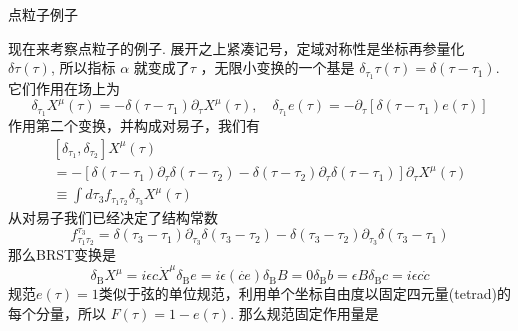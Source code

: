 \centerline{\Large 点粒子例子}
现在来考察点粒子的例子. 展开之上紧凑记号，定域对称性是坐标再参量化 $\delta \tau(\tau)$, 所以指标 $\alpha$ 就变成了$\tau$ ，无限小变换的一个基是 $\delta_{\tau_{1}} \tau(\tau)=\delta\left(\tau-\tau_{1}\right)$. 它们作用在场上为
\begin{equation}
	\delta_{\tau_{1}} X^{\mu}(\tau)=-\delta\left(\tau-\tau_{1}\right) \partial_{\tau} X^{\mu}(\tau), \quad \delta_{\tau_{1}} e(\tau)=-\partial_{\tau}\left[\delta\left(\tau-\tau_{1}\right) e(\tau)\right]
\end{equation}
作用第二个变换，并构成对易子，我们有
\begin{equation}
	\begin{array}{l}
		{\left[\delta_{\tau_{1}}, \delta_{\tau_{2}}\right] X^{\mu}(\tau)} \\
		=-\left[\delta\left(\tau-\tau_{1}\right) \partial_{\tau} \delta\left(\tau-\tau_{2}\right)-\delta\left(\tau-\tau_{2}\right) \partial_{\tau} \delta\left(\tau-\tau_{1}\right)\right] \partial_{\tau} X^{\mu}(\tau) \\
		\equiv \int d \tau_{3} f_{\tau_{1} \tau_{2}} \delta_{\tau_{3}} X^{\mu}(\tau)
	\end{array}
\end{equation}
从对易子我们已经决定了结构常数
\begin{equation}
	f_{\tau_{1} \tau_{2}}^{\tau_{3}}=\delta\left(\tau_{3}-\tau_{1}\right) \partial_{\tau_{3}} \delta\left(\tau_{3}-\tau_{2}\right)-\delta\left(\tau_{3}-\tau_{2}\right) \partial_{\tau_{3}} \delta\left(\tau_{3}-\tau_{1}\right)
\end{equation}
那么BRST变换是
\begin{subequations}
\begin{equation}
\delta_{\mathrm{B}} X^{\mu}=i \epsilon c \dot{X}^{\mu}
\end{equation}
\begin{equation}
\delta_{\mathrm{B}} e=i \epsilon(\dot{c e})
\end{equation}
\begin{equation}
\delta_{\mathrm{B}} B=0
\end{equation}
\begin{equation}
\delta_{\mathrm{B}} b=\epsilon B
\end{equation}
\begin{equation}
\delta_{\mathrm{B}} c=i \epsilon c \dot{c}
\end{equation}
\end{subequations}
规范$e(\tau)=1$类似于弦的单位规范，利用单个坐标自由度以固定四元量(tetrad)的每个分量，所以 $F(\tau)=1-e(\tau)$. 那么规范固定作用量是

